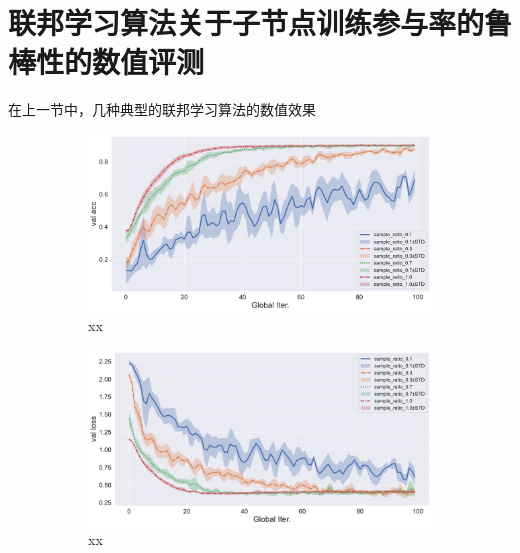 \section{联邦学习算法关于子节点训练参与率的鲁棒性的数值评测}
\label{sec:chap6-sample}


在上一节中，几种典型的联邦学习算法的数值效果

\begin{figure}[ht]
\centering
\begin{subfigure}{.5\textwidth}
  \centering
  \includegraphics[width=.95\linewidth]{figures/fedprox-compare-sample-ratio-val-acc.pdf}
  \caption{xx}
  \label{fig:fedprox-compare-sample-ratio-val-acc}
\end{subfigure}%
\begin{subfigure}{.5\textwidth}
  \centering
  \includegraphics[width=.95\linewidth]{figures/fedprox-compare-sample-ratio-val-loss.pdf}
  \caption{xx}
  \label{fig:fedprox-compare-sample-ratio-val-loss}
\end{subfigure}
\begin{subfigure}{.5\textwidth}

\end{subfigure}
\end{figure}
